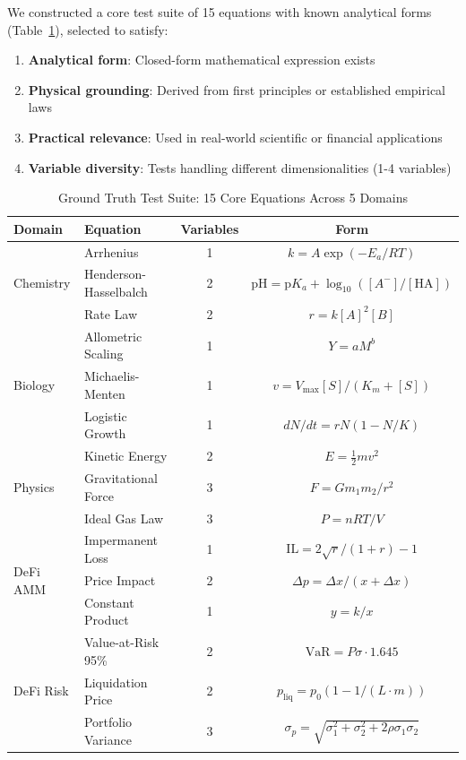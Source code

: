 We constructed a core test suite of 15 equations with known analytical forms (Table~\ref{tab:ground_truth_suite}), selected to satisfy:

\begin{enumerate}
    \item \textbf{Analytical form}: Closed-form mathematical expression exists
    \item \textbf{Physical grounding}: Derived from first principles or established empirical laws
    \item \textbf{Practical relevance}: Used in real-world scientific or financial applications
    \item \textbf{Variable diversity}: Tests handling different dimensionalities (1-4 variables)
\end{enumerate}

\begin{table}[htbp]
\centering
\caption{Ground Truth Test Suite: 15 Core Equations Across 5 Domains}
\label{tab:ground_truth_suite}
\small
\begin{tabular}{llcc}
\toprule
\textbf{Domain} & \textbf{Equation} & \textbf{Variables} & \textbf{Form} \\
\midrule
\multirow{3}{*}{Chemistry}
& Arrhenius & 1 & $k = A\exp(-E_a/RT)$ \\
& Henderson-Hasselbalch & 2 & $\text{pH} = \text{p}K_a + \log_{10}([A^-]/[\text{HA}])$ \\
& Rate Law & 2 & $r = k[A]^2[B]$ \\
\midrule
\multirow{3}{*}{Biology}
& Allometric Scaling & 1 & $Y = aM^b$ \\
& Michaelis-Menten & 1 & $v = V_{\max}[S]/(K_m + [S])$ \\
& Logistic Growth & 1 & $dN/dt = rN(1-N/K)$ \\
\midrule
\multirow{3}{*}{Physics}
& Kinetic Energy & 2 & $E = \frac{1}{2}mv^2$ \\
& Gravitational Force & 3 & $F = Gm_1m_2/r^2$ \\
& Ideal Gas Law & 3 & $P = nRT/V$ \\
\midrule
\multirow{3}{*}{DeFi AMM}
& Impermanent Loss & 1 & $\text{IL} = 2\sqrt{r}/(1+r) - 1$ \\
& Price Impact & 2 & $\Delta p = \Delta x/(x + \Delta x)$ \\
& Constant Product & 1 & $y = k/x$ \\
\midrule
\multirow{3}{*}{DeFi Risk}
& Value-at-Risk 95\% & 2 & $\text{VaR} = P\sigma \cdot 1.645$ \\
& Liquidation Price & 2 & $p_{\text{liq}} = p_0(1 - 1/(L \cdot m))$ \\
& Portfolio Variance & 3 & $\sigma_p = \sqrt{\sigma_1^2 + \sigma_2^2 + 2\rho\sigma_1\sigma_2}$ \\
\bottomrule
\end{tabular}
\end{table}

